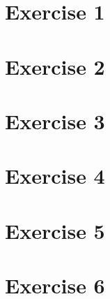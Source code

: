 \documentclass[twoside, a4paper, fleqn, reqno]{article}
\begin{document}
\maketitle

\section*{Exercise 1}

\section*{Exercise 2}

\section*{Exercise 3}

\section*{Exercise 4}

\section*{Exercise 5}

\section*{Exercise 6}
\end{document}
